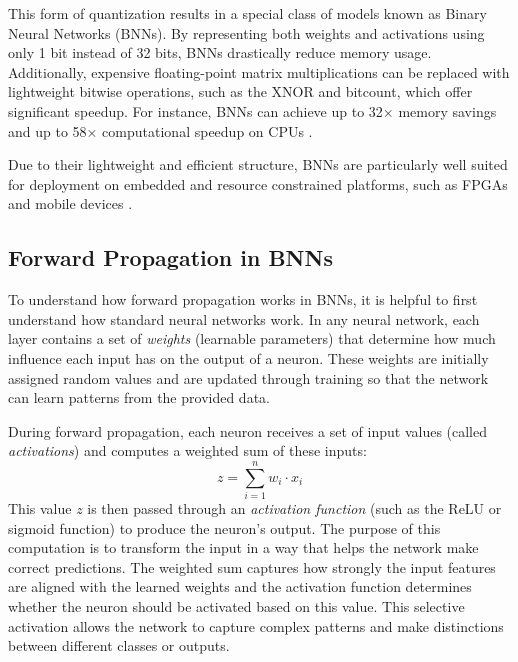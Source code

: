 \documentclass[a4paper,12pt]{report}
\begin{document}
This form of quantization results in a special class of models known as Binary Neural Networks (BNNs). By representing both weights and activations using only 1 bit instead of 32 bits, BNNs drastically reduce memory usage. Additionally, expensive floating-point matrix multiplications can be replaced with lightweight bitwise operations, such as the XNOR and bitcount, which offer significant speedup. For instance, BNNs can achieve up to 32× memory savings and up to 58× computational speedup on CPUs \cite[p.~4]{Qin_2020}.

Due to their lightweight and efficient structure, BNNs are particularly well suited for deployment on embedded and resource constrained platforms, such as FPGAs and mobile devices \cite{Qin_2020}.


\subsection{Forward Propagation in BNNs}
To understand how forward propagation works in BNNs, it is helpful to first understand how standard neural networks work. In any neural network, each layer contains a set of \textit{weights} (learnable parameters) that determine how much influence each input has on the output of a neuron. These weights are initially assigned random values and are updated through training so that the network can learn patterns from the provided data.

During forward propagation, each neuron receives a set of input values (called \textit{activations}) and computes a weighted sum of these inputs:
\[z = \sum_{i=1}^{n} w_i \cdot x_i\]
This value \(z\) is then passed through an \textit{activation function} (such as the ReLU or sigmoid function) to produce the neuron’s output. The purpose of this computation is to transform the input in a way that helps the network make correct predictions. The weighted sum captures how strongly the input features are aligned with the learned weights and the activation function determines whether the neuron should be activated based on this value. This selective activation allows the network to capture complex patterns and make distinctions between different classes or outputs.
\end{document}
